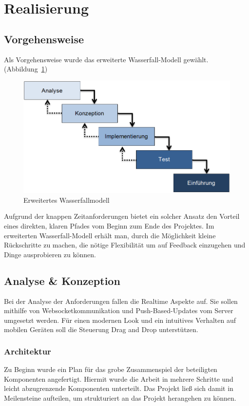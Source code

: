 \section{Realisierung}
\subsection{Vorgehensweise}
Als Vorgehensweise wurde das erweiterte
Wasserfall-Modell gewählt. (Abbildung~\ref{fig:wasserfall_modell})
\begin{figure}[h]
\includegraphics[scale=0.5]{img/wasserfall_modell.png}
\caption{Erweitertes Wasserfallmodell\label{fig:wasserfall_modell}}
\end{figure}
Aufgrund der knappen Zeitanforderungen bietet ein solcher Ansatz
den Vorteil eines direkten, klaren Pfades vom Beginn zum Ende des
Projektes. Im erweiterten Wasserfall-Modell erhält man, durch die
Möglichkeit kleine Rückschritte zu machen, die nötige Flexibilität um
auf Feedback einzugehen und Dinge ausprobieren zu können.
\subsection{Analyse \& Konzeption}
Bei der Analyse der Anforderungen fallen die Realtime Aspekte auf. Sie
sollen mithilfe von Websocketkommunikation und Push-Based-Updates vom
Server umgesetzt werden. Für einen modernen Look und ein intuitives
Verhalten auf mobilen Geräten soll die Steuerung Drag and Drop unterstützen.
\subsubsection{Architektur}
Zu Beginn wurde ein Plan für das grobe Zusammenspiel der beteiligten
Komponenten angefertigt. Hiermit wurde die Arbeit in mehrere Schritte
und leicht abzugrenzende Komponenten unterteilt. Das Projekt ließ sich
damit in Meilensteine aufteilen, um strukturiert an das Projekt
herangehen zu können.

